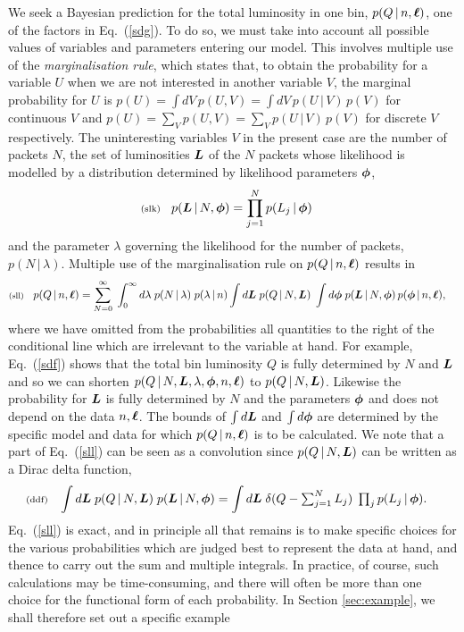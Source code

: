 \documentclass[11pt]{article}
\newcommand{\lleq}[1]{\label{#1} }
\renewcommand{\lleq}[1]{\label{#1} {\scriptstyle {\rm (#1)}} \hspace*{2ex} }
\newcommand{\cond}{\,|\,}
\begin{document}
We seek a Bayesian prediction for the total luminosity in one bin,
$p(Q\cond n,\bml)$, one of the factors in Eq.~(\ref{sdg}).  To do so,
we must take into account all possible values of variables and
parameters entering our model.  This involves multiple use of the
\textit{marginalisation rule}, which states that, to obtain the
probability for a variable $U$ when we are not interested in another
variable $V$, the marginal probability for $U$ is %
$p(U) = \int dV\,p(U,V) = \int dV\,p(U\cond V)\,p(V)$ for continuous
$V$ and $p(U) = \sum_V p(U,V) = \sum_V p(U\cond V)\,p(V)$ for discrete
$V$ respectively.
% 
The uninteresting variables $V$ in the present case are the number of
packets $N$, the set of luminosities ${\bm{L}}$ of the $N$ packets
whose likelihood is modelled by a distribution determined by
likelihood parameters ${\bm{\phi}}$,
\begin{align}
  \lleq{slk}
  p(\bmL\cond N,\bmphi)
  &= \prod_{j=1}^{N} p(L_j\cond \bmphi)
\end{align}
and the parameter $\lambda$ governing the likelihood for the number of
packets, $p(N\cond\lambda)$. Multiple use of the marginalisation rule
on $p(Q\cond n,\bml)$ results in
\begin{align}
  \lleq{sll}
  p(Q\cond n,\bml)
  &= \sum_{N=0}^\infty \;\int_0^\infty d\lambda\;
    p(N\cond\lambda)\;
    p(\lambda\cond n)
    \int d\bmL\;
    p(Q\cond N,\bmL)\;
    \int d\bmphi\;
    p(\bmL\cond N,\bmphi)\,
    p(\bmphi\cond n,\bml),
\end{align}
where we have omitted from the probabilities all quantities to the
right of the conditional line which are irrelevant to the variable at
hand. For example, Eq.~(\ref{sdf}) shows that the total bin luminosity
$Q$ is fully determined by $N$ and ${\bm{L}}$ and so we can shorten
$p(Q\cond N,\bmL,\lambda,\bmphi,n,\bml)$ to $p(Q\cond N,\bmL)$. %
Likewise the probability for ${\bm{L}}$ is fully determined by $N$ and the
parameters ${\bm{\phi}}$ and does not depend on the data $n,{\bm{\ell}}$.  The
bounds of $\int d{\bm{L}}$ and $\int d{\bm{\phi}}$ are determined by the
specific model and data for which $p(Q\cond n,\bml)$ is to be
calculated.
% 
We note that a part of Eq.~(\ref{sll}) can be seen as a convolution
since $p(Q\cond N,\bmL)$ can be written as a Dirac delta function,
\begin{align}
  \lleq{ddf}
  \int d\bmL\; p(Q\cond N,\bmL)\; p(\bmL\cond N,\bmphi)
  &= \int d\bmL\;\delta(Q - \textstyle\sum_{j=1}^N L_j)\; \prod_j p(L_j\cond \bmphi).
\end{align}
Eq.~(\ref{sll}) is exact, and in principle all that remains is to make
specific choices for the various probabilities which are judged best
to represent the data at hand, and thence to carry out the sum and
multiple integrals. In practice, of course, such calculations may be
time-consuming, and there will often be more than one choice for the
functional form of each probability. In Section \ref{sec:example}, we
shall therefore set out a specific example
\end{document}
